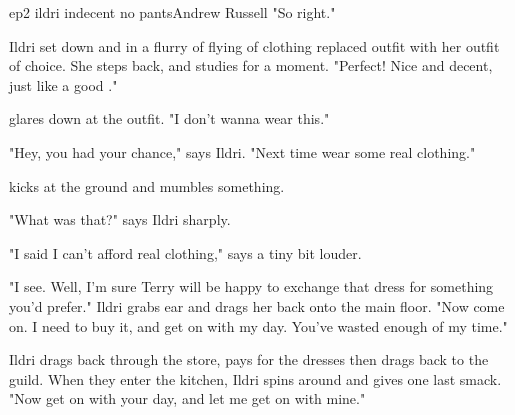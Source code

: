 \documentclass{book}
\begin{document}
\begin{childnode}{ep2 ildri indecent no pants}{Andrew Russell}
"So right."    

Ildri set \name{} down and in a flurry of flying of clothing replaced \names{} outfit with her outfit of choice. She steps back, and studies \name{} for a moment. "Perfect! Nice and decent, just
like a good \boygirl{}."

\name{} glares down at the outfit. "I don't wanna wear this."

"Hey, you had your chance," says Ildri. "Next time wear some real clothing."

\name{} kicks at the ground and mumbles something.

"What was that?" says Ildri sharply.

"I said I can't afford real clothing," says \name{} a tiny bit louder.

"I see. Well, I'm sure Terry will be happy to exchange that dress for something you'd prefer." Ildri grabs \names{} ear and drags her back onto the main floor. "Now come on. I need to buy it, and
get on with my day. You've wasted enough of my time."

Ildri drags \name{} back through the store, pays for the dresses then drags \name{} back to the guild. When they enter the kitchen, Ildri spins \name{} around and gives \name{} one last smack. 
"Now get on with your day, and let me get on with mine."



\end{childnode}
\end{document}
